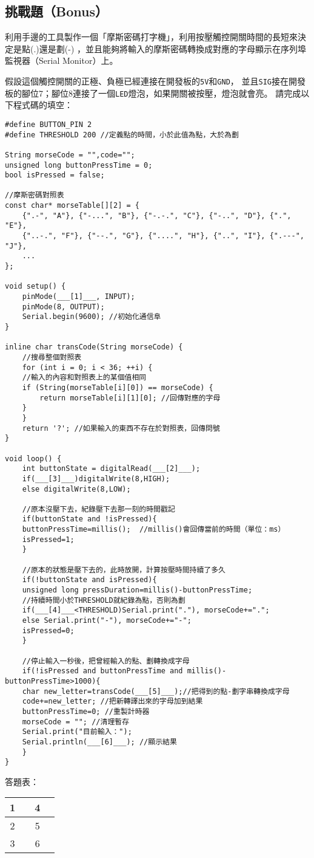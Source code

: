 \documentclass[12pt,a4paper]{article}
\begin{document}
\subsection{挑戰題（Bonus）}

利用手邊的工具製作一個「摩斯密碼打字機」，利用按壓觸控開關時間的長短來決定是點(.)還是劃(-)
，並且能夠將輸入的摩斯密碼轉換成對應的字母顯示在序列埠監視器（Serial Monitor）上。

假設這個觸控開關的正極、負極已經連接在開發板的\texttt{5V}和\texttt{GND}，
並且\texttt{SIG}接在開發板的腳位7；腳位8連接了一個\texttt{LED}燈泡，如果開關被按壓，燈泡就會亮。
請完成以下程式碼的填空：

\begin{lstlisting}
#define BUTTON_PIN 2
#define THRESHOLD 200 //定義點的時間，小於此值為點，大於為劃

String morseCode = "",code="";
unsigned long buttonPressTime = 0;
bool isPressed = false;

//摩斯密碼對照表
const char* morseTable[][2] = {
    {".-", "A"}, {"-...", "B"}, {"-.-.", "C"}, {"-..", "D"}, {".", "E"},
    {"..-.", "F"}, {"--.", "G"}, {"....", "H"}, {"..", "I"}, {".---", "J"},
    ...
};

void setup() {
    pinMode(___[1]___, INPUT);
    pinMode(8, OUTPUT);
    Serial.begin(9600); //初始化通信阜
}

inline char transCode(String morseCode) {
    //搜尋整個對照表
    for (int i = 0; i < 36; ++i) {
    //輸入的內容和對照表上的某個值相同
    if (String(morseTable[i][0]) == morseCode) {
        return morseTable[i][1][0]; //回傳對應的字母
    }
    }
    return '?'; //如果輸入的東西不存在於對照表，回傳問號
}

void loop() {
    int buttonState = digitalRead(___[2]___);
    if(___[3]___)digitalWrite(8,HIGH);
    else digitalWrite(8,LOW);

    //原本沒壓下去，紀錄壓下去那一刻的時間戳記
    if(buttonState and !isPressed){
    buttonPressTime=millis();  //millis()會回傳當前的時間（單位：ms）
    isPressed=1;
    }
    
    //原本的狀態是壓下去的，此時放開，計算按壓時間持續了多久
    if(!buttonState and isPressed){
    unsigned long pressDuration=millis()-buttonPressTime;
    //持續時間小於THRESHOLD就紀錄為點，否則為劃
    if(___[4]___<THRESHOLD)Serial.print("."), morseCode+=".";
    else Serial.print("-"), morseCode+="-";
    isPressed=0;
    }
    
    //停止輸入一秒後，把曾經輸入的點、劃轉換成字母
    if(!isPressed and buttonPressTime and millis()-buttonPressTime>1000){
    char new_letter=transCode(___[5]___);//把得到的點-劃字串轉換成字母
    code+=new_letter; //把新轉譯出來的字母加到結果
    buttonPressTime=0; //重製計時器
    morseCode = ""; //清理暫存
    Serial.print("目前輸入：");
    Serial.println(___[6]___); //顯示結果
    }
}
\end{lstlisting}

答題表：
\begin{table}[h!]
\centering
\begin{tabular}{|c|p{7cm}|c|p{7cm}|}
\hline
1 &  & 4 & \\ \hline
2 &  & 5 & \\ \hline
3 &  & 6 & \\ \hline
\end{tabular}
\end{table}
\end{document}
